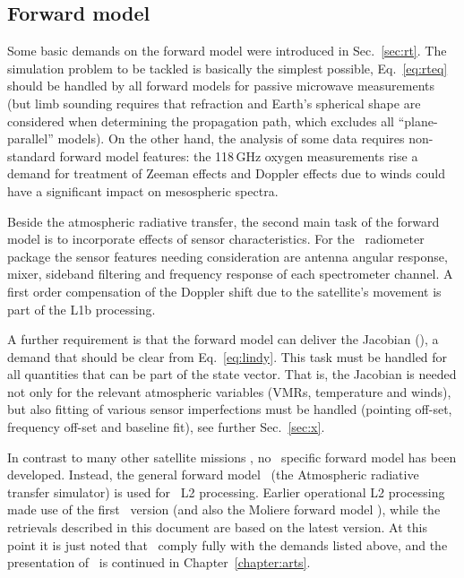 \subsection{Forward model}
\label{sec:setup:forward}
%
Some basic demands on the forward model were introduced in Sec.~\ref{sec:rt}.
The simulation problem to be tackled is basically the simplest possible,
Eq.~\ref{eq:rteq} should be handled by all forward models for passive microwave
measurements (but limb sounding requires that refraction and Earth's spherical
shape are considered when determining the propagation path, which excludes all
``plane-parallel'' models). On the other hand, the analysis of some data
requires non-standard forward model features: the 118\,GHz oxygen measurements
rise a demand for treatment of Zeeman effects and Doppler effects due to winds
could have a significant impact on mesospheric spectra.

Beside the atmospheric radiative transfer, the second main task of the forward
model is to incorporate effects of sensor characteristics. For the \smr\
radiometer package the sensor features needing consideration are antenna
angular response, mixer, sideband filtering and frequency response of each
spectrometer channel. A first order compensation of the Doppler shift due to
the satellite's movement is part of the L1b processing.

A further requirement is that the forward model can deliver the Jacobian
(\aWfnMtr{\SttVct}), a demand that should be clear from Eq.~\ref{eq:lindy}.
This task must be handled for all quantities that can be part of the state
vector. That is, the Jacobian is needed not only for the relevant atmospheric
variables (VMRs, temperature and winds), but also fitting of various sensor
imperfections must be handled (pointing off-set, frequency off-set and baseline
fit), see further Sec.~\ref{sec:x}.

In contrast to many other satellite missions \citep[e.g.][]{read2006clear}, no
\smr\ specific forward model has been developed. Instead, the general forward
model \ARTS\ (the Atmospheric radiative transfer simulator) is used for \smr\
L2 processing. Earlier operational L2 processing \citep{urban:odins:05-b} made
use of the first \ARTS\ version (and also the Moliere forward model
\citep{urban2004moliere}), while the retrievals described in this document are
based on the latest version. At this point it is just noted that \ARTS\ comply
fully with the demands listed above, and the presentation of \ARTS\ is
continued in Chapter~\ref{chapter:arts}.



